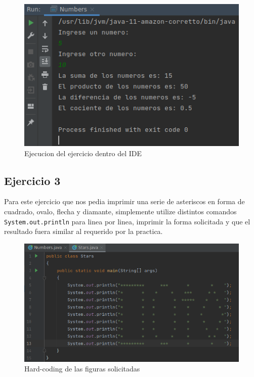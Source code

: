 \documentclass{article}
\begin{document}
 		\begin{figure}[H]
 			\centering
 			\includegraphics[scale = 0.75]{images/numbersout}
 			\caption{Ejecucion del ejercicio dentro del IDE}
 		\end{figure}  
 		
 		\subsection{Ejercicio 3}
 		
 		Para este ejercicio que nos pedia imprimir una serie de asteriscos en forma de cuadrado, ovalo, flecha y diamante, simplemente utilize distintos comandos \verb*|System.out.println| para linea por linea, imprimir la forma solicitada y que el resultado fuera similar al requerido por la practica.
 		
 		\begin{figure}[H]
 			\centering
 			\includegraphics[scale = 0.5]{images/stars}
 			\caption{Hard-coding de las figuras solicitadas}
 		\end{figure}
 	
\end{document}
